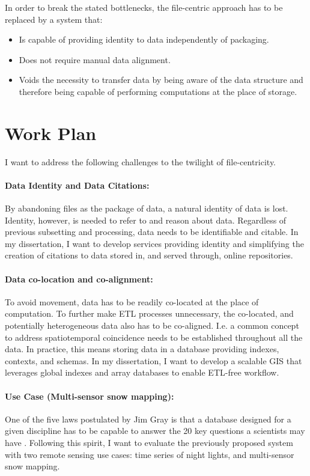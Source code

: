 \documentclass[letterpaper, parskip=half]{scrartcl}
\begin{document}
In order to break the stated bottlenecks, the file-centric approach has to be replaced by a system that:
\begin{itemize}
    \item Is capable of providing identity to data independently of packaging.
    \item Does not require manual data alignment.
    \item Voids the necessity to transfer data by being aware of the data structure and therefore being capable of performing computations at the place of storage.
\end{itemize}


\newpage

\section{Work Plan}
I want to address the following challenges to the twilight of file-centricity.

\paragraph{Data Identity and Data Citations:}
By abandoning files as the package of data, a natural identity of data is lost. Identity, however, is needed to refer to and reason about data.
Regardless of previous subsetting and processing, data needs to be identifiable and citable. In my dissertation, I want to develop services providing identity and simplifying the creation of citations to data stored in, and served through, online repositories.

\paragraph{Data co-location and co-alignment:}
To avoid movement, data has to be readily co-located at the place of computation. To further make \gls{ETL} processes unnecessary, the co-located, and potentially heterogeneous data also has to be co-aligned. I.e. a common concept to address spatiotemporal coincidence needs to be established throughout all the data. In practice, this means storing data in a database providing indexes, contexts, and schemas. 
In my dissertation, I want to develop a scalable \gls{GIS} that leverages global indexes and array databases to enable \gls{ETL}-free workflow.

\paragraph{Use Case (Multi-sensor snow mapping):}
One of the five laws postulated by Jim Gray is that a database designed for a given discipline has to be capable to answer the 20 key questions a scientists may have \citep{Hey2009, Szalay2009}.
Following this spirit, I want to evaluate the previously proposed system with two remote sensing use cases: time series of night lights, and multi-sensor snow mapping.  
\end{document}
